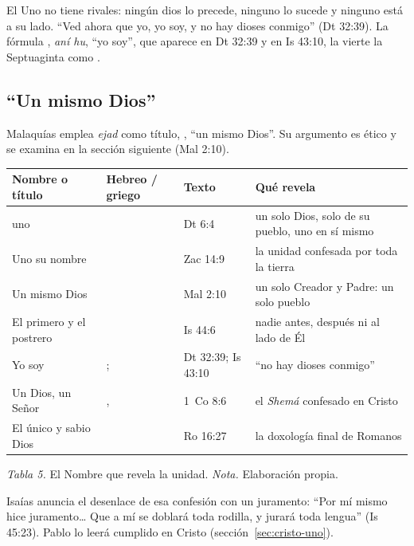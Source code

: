 El Uno no tiene rivales: ningún dios lo precede, ninguno lo sucede y ninguno está a su lado. ``Ved ahora que yo, yo soy, y no hay dioses conmigo'' (Dt 32:39). La fórmula , \emph{aní hu}, ``yo soy'', que aparece en Dt 32:39 y en Is 43:10, la vierte la Septuaginta como .

\subsection{“Un mismo Dios”}
Malaquías emplea \emph{ejad} como título, , ``un mismo Dios''. Su argumento es ético y se examina en la sección siguiente (Mal 2:10).

\begin{center}\small\renewcommand{\arraystretch}{1.3}
\begin{tabular}{@{}L{3.2cm}L{3.8cm}L{2.2cm}L{5.4cm}@{}}
\toprule
\textbf{Nombre o título} & \textbf{Hebreo / griego} & \textbf{Texto} & \textbf{Qué revela} \\ \midrule
\SENOR{} uno &  & Dt 6:4 & un solo Dios, solo de su pueblo, uno en sí mismo \\
Uno su nombre &  & Zac 14:9 & la unidad confesada por toda la tierra \\
Un mismo Dios &  & Mal 2:10 & un solo Creador y Padre: un solo pueblo \\
El primero y el postrero &  & Is 44:6 & nadie antes, después ni al lado de Él \\
Yo soy & ;  & Dt 32:39; Is 43:10 & ``no hay dioses conmigo'' \\
Un Dios, un Señor & ,  & 1~Co 8:6 & el \emph{Shemá} confesado en Cristo \\
El único y sabio Dios &  & Ro 16:27 & la doxología final de Romanos \\
\bottomrule
\end{tabular}\par
{\footnotesize\color{gris}\textit{Tabla 5.} El Nombre que revela la unidad. \textit{Nota.} Elaboración propia.}
\end{center}

Isaías anuncia el desenlace de esa confesión con un juramento: ``Por mí mismo hice juramento\ldots{} Que a mí se doblará toda rodilla, y jurará toda lengua'' (Is 45:23). Pablo lo leerá cumplido en Cristo (sección~\ref{sec:cristo-uno}).

